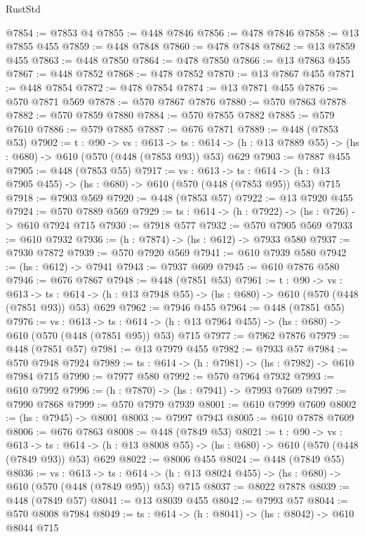 \begin{lexlean}{RustStd}
\begin{coremodule}
@7854 := @7853 @4
@7855 := @448 @7846
@7856 := @478 @7846
@7858 := @13 @7855 @455
@7859 := @448 @7848
@7860 := @478 @7848
@7862 := @13 @7859 @455
@7863 := @448 @7850
@7864 := @478 @7850
@7866 := @13 @7863 @455
@7867 := @448 @7852
@7868 := @478 @7852
@7870 := @13 @7867 @455
@7871 := @448 @7854
@7872 := @478 @7854
@7874 := @13 @7871 @455
@7876 := @570 @7871 @569
@7878 := @570 @7867 @7876
@7880 := @570 @7863 @7878
@7882 := @570 @7859 @7880
@7884 := @570 @7855 @7882
@7885 := @579 @7610
@7886 := @579 @7885
@7887 := @676 @7871
@7889 := @448 (@7853 @53)
@7902 := {t : @90} ->
  {vs : @613} ->
  {ts : @614} -> (h : @13 @7889 @55) -> (hs : @680) -> @610 (@570 (@448 (@7853 @93)) @53) @629
@7903 := @7887 @455
@7905 := @448 (@7853 @55)
@7917 := {vs : @613} ->
  {ts : @614} -> (h : @13 @7905 @455) -> (hs : @680) -> @610 (@570 (@448 (@7853 @95)) @53) @715
@7918 := @7903 @569
@7920 := @448 (@7853 @57)
@7922 := @13 @7920 @455
@7924 := @570 @7889 @569
@7929 := {ts : @614} -> (h : @7922) -> (hs : @726) -> @610 @7924 @715
@7930 := @7918 @577
@7932 := @570 @7905 @569
@7933 := @610 @7932
@7936 := (h : @7874) -> (hs : @612) -> @7933 @580
@7937 := @7930 @7872
@7939 := @570 @7920 @569
@7941 := @610 @7939 @580
@7942 := (hs : @612) -> @7941
@7943 := @7937 @609
@7945 := @610 @7876 @580
@7946 := @676 @7867
@7948 := @448 (@7851 @53)
@7961 := {t : @90} ->
  {vs : @613} ->
  {ts : @614} -> (h : @13 @7948 @55) -> (hs : @680) -> @610 (@570 (@448 (@7851 @93)) @53) @629
@7962 := @7946 @455
@7964 := @448 (@7851 @55)
@7976 := {vs : @613} ->
  {ts : @614} -> (h : @13 @7964 @455) -> (hs : @680) -> @610 (@570 (@448 (@7851 @95)) @53) @715
@7977 := @7962 @7876
@7979 := @448 (@7851 @57)
@7981 := @13 @7979 @455
@7982 := @7933 @57
@7984 := @570 @7948 @7924
@7989 := {ts : @614} -> (h : @7981) -> (hs : @7982) -> @610 @7984 @715
@7990 := @7977 @580
@7992 := @570 @7964 @7932
@7993 := @610 @7992
@7996 := (h : @7870) -> (hs : @7941) -> @7993 @7609
@7997 := @7990 @7868
@7999 := @570 @7979 @7939
@8001 := @610 @7999 @7609
@8002 := (hs : @7945) -> @8001
@8003 := @7997 @7943
@8005 := @610 @7878 @7609
@8006 := @676 @7863
@8008 := @448 (@7849 @53)
@8021 := {t : @90} ->
  {vs : @613} ->
  {ts : @614} -> (h : @13 @8008 @55) -> (hs : @680) -> @610 (@570 (@448 (@7849 @93)) @53) @629
@8022 := @8006 @455
@8024 := @448 (@7849 @55)
@8036 := {vs : @613} ->
  {ts : @614} -> (h : @13 @8024 @455) -> (hs : @680) -> @610 (@570 (@448 (@7849 @95)) @53) @715
@8037 := @8022 @7878
@8039 := @448 (@7849 @57)
@8041 := @13 @8039 @455
@8042 := @7993 @57
@8044 := @570 @8008 @7984
@8049 := {ts : @614} -> (h : @8041) -> (hs : @8042) -> @610 @8044 @715

\end{coremodule}
\end{lexlean}
